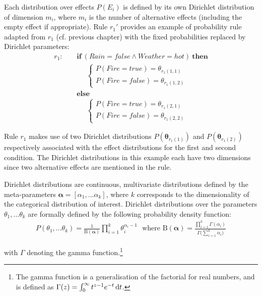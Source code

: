 Each distribution over effects $P(E_i)$ is defined by its own Dirichlet distribution of dimension $m_i$, where $m_i$ is the number of alternative effects (including the empty effect if appropriate).  Rule $r_{1}'$ provides an example of probability rule adapted from $r_1$ (cf. previous chapter) with the fixed probabilities replaced by Dirichlet parameters:
\begin{align*}
r_{1}: \ \ \ \ \ & \textbf{if} \ (\mathit{Rain}\!=\!\mathit{false} \land \mathit{Weather}\!=\!\mathit{hot}) \ \textbf{then} \\
& \;\;\;\;\;  \begin{cases}
 P(\mathit{Fire}\!=\!\mathit{true}) = \theta_{r_{1}(1,1)} \\ 
P(\mathit{Fire}\!=\!\mathit{false}) = \theta_{r_{1}(1,2)}
\end{cases} \\ 
& \textbf{else} \\
& \;\;\;\;\; \begin{cases}
P(\mathit{Fire}\!=\!\mathit{true}) = \theta_{r_{1}(2,1)} \\
P(\mathit{Fire}\!=\!\mathit{false}) = \theta_{r_{1}(2,2)}
\end{cases} 
\end{align*}


Rule $r_{1}$ makes use of two Dirichlet distributions $P(\boldsymbol\theta_{r_{1}(1)})$ and $P(\boldsymbol\theta_{r_{1}(2)})$ respectively associated with the effect distributions for the first and second condition.  The Dirichlet distributions in this example each have two dimensions since two alternative effects are mentioned in the rule. 

Dirichlet distributions are continuous, multivariate distributions defined by the meta-parameters $\boldsymbol\alpha = [\alpha_1,... \alpha_k]$, where $k$ corresponds to the dimensionality of the categorical distribution of interest.  Dirichlet distributions over the parameters $\theta_1,... \theta_k$ are formally defined by the following probability density function:
\begin{align}
P(\theta_1,...\theta_k) = \frac{1}{\mathrm{B}(\boldsymbol\alpha)} \prod_{i=1}^k \theta_i^{\alpha_i - 1} \ \ \ \text{where } \mathrm{B}(\boldsymbol\alpha) = \frac{\prod_{i=1}^k \Gamma(\alpha_i)}{\Gamma\bigl(\sum_{i=1}^k \alpha_i\bigr)}
\end{align}

with $\Gamma$ denoting the gamma function.\footnote{The gamma function is a generalisation of the factorial for real numbers, and is defined as $\Gamma(z) = \int_0^\infty  t^{z-1} e^{-t}\,{\rm d}t$.}

